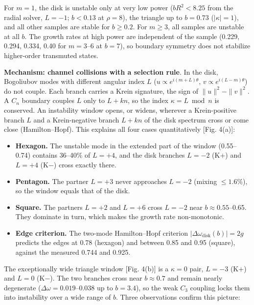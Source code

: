 For \(m = 1\), the disk is unstable only at very low power (\(bR^2 < 8.25\) from the radial solver, \(L = -1\); \(b < 0.13\) at \(\rho = 8\)), the triangle up to \(b = 0.73\) (\(|\kappa| = 1\)), and all other samples are stable for \(b \ge 0.2\). For \(m \ge 3\), all samples are unstable at all \(b\). The growth rates at high power are independent of the sample (0.229, 0.294, 0.334, 0.40 for \(m = 3\)--6 at \(b = 7\)), so boundary symmetry does not stabilize higher-order transmuted states.

\textbf{Mechanism: channel collisions with a selection rule}. In the disk, Bogoliubov modes with different angular index \(L\) (\(u \propto e^{i(m+L)\theta}\), \(v \propto e^{i(L-m)\theta}\)) do not couple. Each branch carries a Krein signature, the sign of \(\|u\|^2 - \|v\|^2\). A \(C_n\) boundary couples \(L\) only to \(L + kn\), so the index \(\kappa = L \bmod n\) is conserved. An instability window opens, or widens, wherever a Krein-positive branch \(L\) and a Krein-negative branch \(L + kn\) of the disk spectrum cross or come close (Hamilton--Hopf). This explains all four cases quantitatively {[}Fig. 4(a){]}:

\begin{itemize}
\tightlist
\item
  \textbf{Hexagon.} The unstable mode in the extended part of the window (0.55--0.74) contains 36--40\% of \(L = +4\), and the disk branches \(L = -2\) (K\(+\)) and \(L = +4\) (K\(-\)) cross exactly there.
\item
  \textbf{Pentagon.} The partner \(L = +3\) never approaches \(L = -2\) (mixing \(\le 1.6\%\)), so the window equals that of the disk.
\item
  \textbf{Square.} The partners \(L = +2\) and \(L = +6\) cross \(L = -2\) near \(b \approx 0.55\)--0.65. They dominate in turn, which makes the growth rate non-monotonic.
\item
  \textbf{Edge criterion.} The two-mode Hamilton--Hopf criterion \(|\Delta\omega_\mathrm{disk}(b)| = 2 g\) predicts the edges at 0.78 (hexagon) and between 0.85 and 0.95 (square), against the measured 0.744 and 0.925.
\end{itemize}

The exceptionally wide triangle window {[}Fig. 4(b){]} is a \(\kappa = 0\) pair, \(L = -3\) (K\(+\)) and \(L = 0\) (K\(-\)). The two branches cross near \(b \approx 0.7\) and remain nearly degenerate (\(\Delta\omega = 0.019\)--0.038 up to \(b = 3.4\)), so the weak \(C_3\) coupling locks them into instability over a wide range of \(b\). Three observations confirm this picture:

